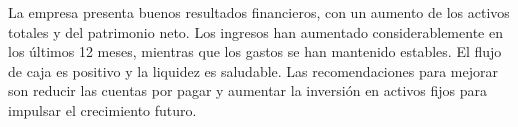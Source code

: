 

La empresa presenta buenos resultados financieros, con un aumento de los activos totales y del patrimonio neto. Los ingresos han aumentado considerablemente en los últimos 12 meses, mientras que los gastos se han mantenido estables. El flujo de caja es positivo y la liquidez es saludable. Las recomendaciones para mejorar son reducir las cuentas por pagar y aumentar la inversión en activos fijos para impulsar el crecimiento futuro.